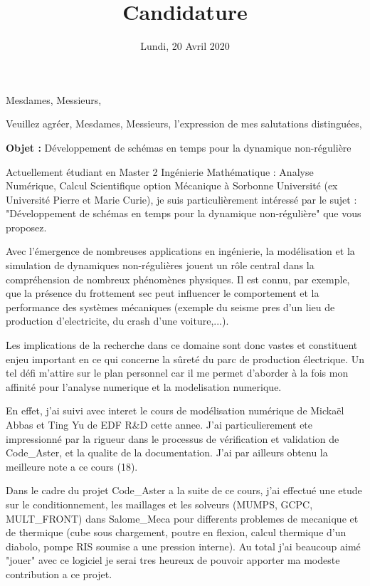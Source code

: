 \documentclass[11pt,a4paper,sans]{moderncv}        %
\title{Candidature}                               %
\begin{document}
\date{Lundi, 20 Avril 2020}
\opening{Mesdames, Messieurs,}
\closing{Veuillez agréer, Mesdames, Messieurs, l’expression de mes salutations distinguées,}
\makelettertitle

\textbf{Objet :} Développement de schémas en temps pour la dynamique non-régulière

Actuellement étudiant en Master 2 Ingénierie Mathématique : Analyse Numérique, Calcul Scientifique option Mécanique à Sorbonne Université (ex Université Pierre et Marie Curie), je suis particulièrement intéressé par le sujet : "Développement de schémas en temps pour la dynamique non-régulière" que vous proposez.

Avec l'émergence de nombreuses applications en ingénierie, la modélisation et la simulation de dynamiques non-régulières jouent un rôle central dans la compréhension de nombreux phénomènes physiques. Il est connu, par exemple, que la présence du frottement sec peut influencer le comportement et la performance des systèmes mécaniques (exemple du seisme pres d'un lieu de production d'electricite, du crash d'une voiture,...).

Les implications de la recherche dans ce domaine sont donc vastes et constituent enjeu important en ce qui concerne la sûreté du parc de production électrique. Un tel défi m'attire sur le plan personnel car il me permet d'aborder à la fois mon affinité pour l'analyse numerique et la modelisation numerique.

En effet, j'ai suivi avec interet le cours de modélisation numérique de Mickaël Abbas et Ting Yu de EDF R\&D cette annee. J'ai particulierement ete impressionné par la rigueur dans le processus de vérification et validation de Code\_Aster, et la qualite de la documentation. J'ai par ailleurs obtenu la meilleure note a ce cours (18).

Dans le cadre du projet Code\_Aster a la suite de ce cours, j'ai effectué une etude sur le conditionnement, les maillages et les solveurs (MUMPS, GCPC, MULT\_FRONT) dans Salome\_Meca pour differents problemes de mecanique et de thermique (cube sous chargement, poutre en flexion, calcul thermique d'un diabolo, pompe RIS soumise a une pression interne).
Au total j'ai beaucoup aimé "jouer" avec ce logiciel je serai tres heureux de pouvoir apporter ma modeste contribution a ce projet.
\end{document}
